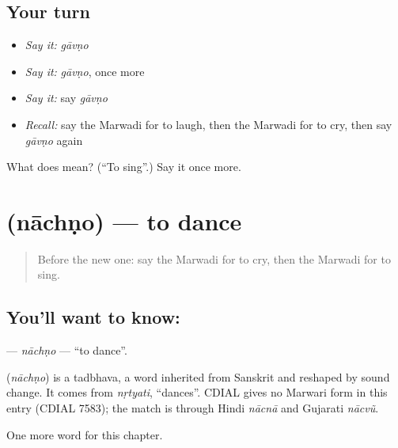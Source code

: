 \subsection*{Your turn}
\begin{itemize}
\raggedright
  \item \emph{Say it:} \emph{gāvṇo}
  \item \emph{Say it:} \emph{gāvṇo}, once more
  \item \emph{Say it:} say \emph{gāvṇo}
  \item \emph{Recall:} say the Marwadi for to laugh, then the Marwadi for to cry, then say \emph{gāvṇo} again
\end{itemize}

\begin{tcolorbox}[breakable,colback=teal!4,colframe=teal!35!black,title={Before you move on}]
What does  mean? (\textquotedblleft{}To sing\textquotedblright{}.) Say it once more.
\end{tcolorbox}
\section[\texorpdfstring{\mw{नाचणो} (nāchṇo)}{नाचणो (nāchṇo)}]{ (nāchṇo) — to dance}

\label{lesson:MW-C54-nachno}



\begin{quote}
Before the new one: say the Marwadi for to cry, then the Marwadi for to sing.
\end{quote}

\subsection*{You'll want to know: }
\textbf{} — \emph{nāchṇo} — \textquotedblleft{}to dance\textquotedblright{}.

\begin{cousinweb}
\textbf{} (\emph{nāchṇo}) is a tadbhava, a word inherited from Sanskrit and reshaped by sound change. It comes from \emph{nṛtyati}, \textquotedblleft{}dances\textquotedblright{}. CDIAL gives no Marwari form in this entry (CDIAL 7583); the match is through Hindi \emph{nācnā} and Gujarati \emph{nācvũ}.
\end{cousinweb}

\begin{grammarlens}[title={What you've built}]
One more word for this chapter.
\end{grammarlens}

